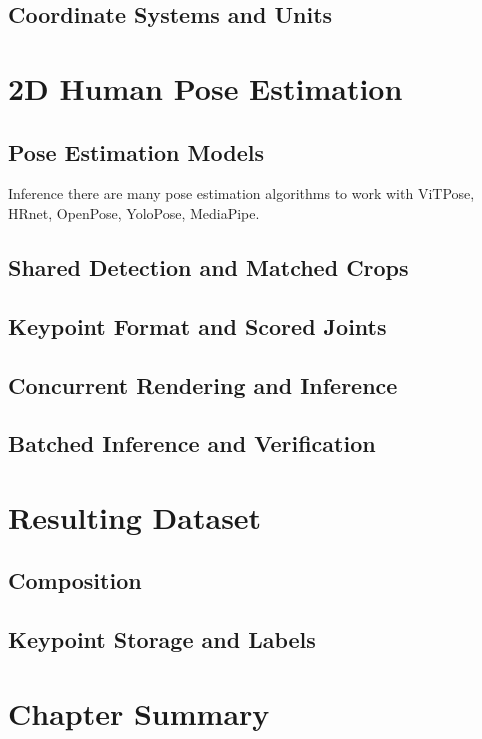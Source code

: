 \subsection{Coordinate Systems and Units}

\section{2D Human Pose Estimation}
\label{sec:inference}

\subsection{Pose Estimation Models}

Inference there are many pose estimation algorithms to work with ViTPose, HRnet, OpenPose, YoloPose, MediaPipe.  

\subsection{Shared Detection and Matched Crops}

\subsection{Keypoint Format and Scored Joints}

\subsection{Concurrent Rendering and Inference}

\subsection{Batched Inference and Verification}

\section{Resulting Dataset}
\label{sec:dataset}

\subsection{Composition}

\subsection{Keypoint Storage and Labels}

\section{Chapter Summary}
\label{sec:pipelinesummary}
